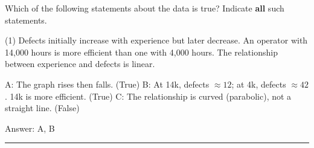 \documentclass[11pt,paper=a4,answers]{exam}
\begin{document}
\begin{questions}
\vspace{1cm}

\question
Which of the following statements about the data is true?
Indicate \textbf{all} such statements.

\begin{tasks}(1)
\task[A)] Defects initially increase with experience but later decrease.
\task[B)] An operator with 14,000 hours is more efficient than one with 4,000 hours.
\task[C)] The relationship between experience and defects is linear.
\end{tasks}

\begin{solution}
\begin{center}
A: The graph rises then falls. (True)
\vspace{5pt}
B: At 14k, defects $\approx 12$; at 4k, defects $\approx 42$. 14k is more efficient. (True)
\vspace{5pt}
C: The relationship is curved (parabolic), not a straight line. (False)
\end{center}

Answer: \colorbox{yellow!100}{A, B}
\end{solution}


\end{questions}
\begin{center}
\rule{.5\textwidth}{1pt}
\end{center}
\end{document}
